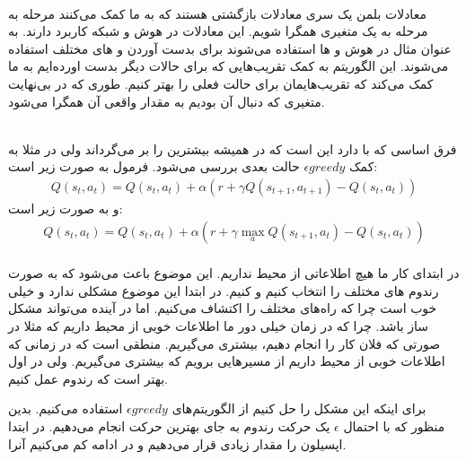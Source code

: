 \documentclass[]{article}
\begin{document}
\printheader

\\\noindent
معادلات بلمن یک سری معادلات بازگشتی هستند که به ما کمک می‌کنند مرحله به مرحله به یک متغیری همگرا شویم.
این معادلات در هوش و شبکه کاربرد دارند. به عنوان مثال در هوش و
ها
استفاده می‌شوند برای بدست آوردن
 و 
های مختلف استفاده می‌شوند. این الگوریتم به کمک تقریب‌هایی که برای حالات دیگر بدست اورده‌ایم به ما کمک می‌کند
که تقریب‌هایمان برای حالت فعلی را بهتر کنیم. طوری که در
بی‌نهایت متغیری که دنبال آن بودیم به مقدار واقعی آن همگرا می‌شود.


\\\noindent
فرق اساسی که
با
دارد این است که در
همیشه بیشترین
را بر می‌گرداند ولی در
مثلا به کمک
$\epsilon greedy$
حالت بعدی بررسی می‌شود.
فرمول
به صورت زیر است:
\begin{gather*}
    Q(s_t, a_t) = Q(s_t, a_t) + \alpha (r + \gamma Q(s_{t+1}, a_{t+1}) - Q(s_t, a_t))
\end{gather*}
و
به صورت زیر است:
\begin{gather*}
    Q(s_t, a_t) = Q(s_t, a_t) + \alpha (r + \gamma \max_a Q(s_{t+1}, a_{t}) - Q(s_t, a_t))
\end{gather*}
\\\noindent
در ابتدای کار ما هیچ اطلاعاتی از محیط نداریم. این موضوع باعث می‌شود که به صورت رندوم
های
مختلف را انتخاب کنیم و
کنیم. در ابتدا این موضوع مشکلی ندارد و خیلی خوب است چرا که راه‌های مختلف را اکتشاف می‌کنیم.
اما در آینده می‌تواند مشکل ساز باشد. چرا که در زمان خیلی دور ما اطلاعات خوبی از محیط داریم
که مثلا در صورتی که فلان کار را انجام دهیم،
بیشتری می‌گیریم. منطقی است که در زمانی که اطلاعات خوبی از محیط داریم از مسیرهایی برویم که
بیشتری می‌گیریم. ولی در اول بهتر است که رندوم عمل کنیم.

برای اینکه این مشکل را حل کنیم از الگوریتم‌های
$\epsilon greedy$
استفاده می‌کنیم. بدین منظور که با احتمال
$\epsilon$
یک حرکت رندوم به جای بهترین حرکت انجام می‌دهیم. در ابتدا اپسیلون را مقدار زیادی قرار می‌دهیم و در ادامه کم می‌کنیم آنرا.
\end{document}
